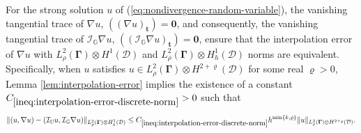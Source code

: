 \documentclass[final,onefignum,onetabnum]{mousaviart}
\begin{document}
			\vspace*{1mm}
			\begin{remark}
				\label{rem:interpolation-error-discrete-norm}
				For the strong solution $u$ of (\ref{eq:nondivergence-random-variable}), the vanishing tangential trace of $\nabla u$, $\left( \left(  \nabla u \right)_{\boldsymbol{t}}  \right) =\boldsymbol{0}$, and consequently, the vanishing tangential trace of $ \mathcal{I}_{\mathbb{G}} \nabla u$, $\left( \left(  \mathcal{I}_{\mathbb{G}} \nabla u\right)_{\boldsymbol{t}} \right) =\boldsymbol{0}$, ensure that the interpolation error of $\nabla u$ with $L^2_{\rho}(\boldsymbol{\Gamma}) \otimes H^1(\mathcal{D})$ and $L^2_{\rho}(\boldsymbol{\Gamma}) \otimes H^1_h(\mathcal{D})$ norms are equivalent. Specifically, when $u$ satisfies $u \in L^2_{\rho}(\boldsymbol{\Gamma}) \otimes H^{2+ \varrho}(\mathcal{D})$ for some real $\varrho >0$, Lemma \ref{lem:interpolation-error} implies the existence of a constant $C_{\ref{ineq:interpolation-error-discrete-norm}}>0$ such that
				\begin{equation}
					\label{ineq:interpolation-error-discrete-norm}
					\lVert (u, \nabla u) - (\mathcal{I}_{\mathbb{U}}u , \mathcal{I}_{\mathbb{G}} \nabla u) \rVert_{L^2_{\rho}(\boldsymbol{\Gamma}) \otimes H^1_h(\mathcal{D})}
					\leq
					C_{\ref{ineq:interpolation-error-discrete-norm}}
					h^{\min\left\lbrace k, \varrho \right\rbrace } \lVert u \rVert_{L^2_{\rho}(\boldsymbol{\Gamma}) \otimes H^{2 + \varrho}(\mathcal{D})}.
				\end{equation}	
			\end{remark}
\end{document}
